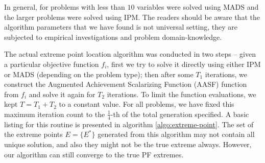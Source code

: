 \documentclass[journal]{IEEEtran}
\begin{document}
%
In general, for problems with less than \(10\) variables were solved using MADS and the larger problems were solved using IPM. The readers should be aware that the algorithm parameters that we have found is not universal setting, they are subjected to empirical investigations and problem domain-knowledge. 

The actual extreme point location algorithm was conducted in two steps -- given a particular objective function \(f_i\), first we try to solve it directly using either IPM or MADS (depending on the problem type); then after some \(T_1\) iterations, we construct the Augmented Achievement Scalarizing Function (AASF) function from \(f_i\) and solve it again for \(T_2\) iterations. To limit the function evaluations, we kept \(T = T_1 + T_2\) to a constant value. For all problems, we have fixed this maximum iteration count to the \(\frac{1}{4}\)-th of the total generation specified. A basic listing for this routine is presented in algorithm \ref{algo:extreme-point}. The set of the extreme points \(E = \{E^\ast\}\) generated from this algorithm may not contain all unique solution, and also they might not be the true extreme always. However, our algorithm can still converge to the true PF extremes.
\end{document}

